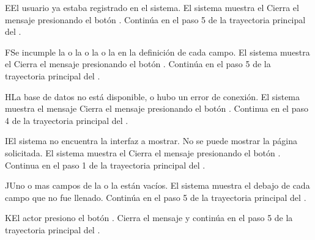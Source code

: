 \begin{UCtrayectoriaA}{E}{El usuario ya estaba registrado en el sistema.}
	\UCpaso El sistema muestra el  
	\UCpaso[\UCactor] Cierra el mensaje presionando el botón .
	\UCpaso Continúa en el paso 5 de la trayectoria principal del .
\end{UCtrayectoriaA}

\begin{UCtrayectoriaA}{F}{Se incumple la  o la   o la  o la  en la definición de cada campo.}
	\UCpaso El sistema muestra el 
	\UCpaso[\UCactor] Cierra el mensaje presionando el botón .
	\UCpaso Continúa en el paso 5 de la trayectoria principal del .
\end{UCtrayectoriaA}



\begin{UCtrayectoriaA}{H}{La base de datos no está disponible, o hubo un error de conexión.}
	\UCpaso El sistema muestra el mensaje 
	\UCpaso[\UCactor] Cierra el mensaje presionando el botón .
	\UCpaso Continua en el paso 4 de la trayectoria principal del .
\end{UCtrayectoriaA}

\begin{UCtrayectoriaA}{I}{El sistema no encuentra la interfaz a mostrar.}
	\UCpaso No se puede mostrar la página solicitada.
	\UCpaso El sistema muestra el 
	\UCpaso[\UCactor] Cierra el mensaje presionando el botón .
	\UCpaso Continua en el paso 1 de la trayectoria principal del .
\end{UCtrayectoriaA}
\begin{UCtrayectoriaA}{J}{Uno o mas campos de la  o la  están vacíos.}
	\UCpaso El sistema muestra el  debajo de cada campo que no fue llenado. 
	\UCpaso	Continúa en el paso 5 de la trayectoria principal del .
\end{UCtrayectoriaA}
\begin{UCtrayectoriaA}{K}{El actor presiono el botón .}
	\UCpaso Cierra el mensaje y continúa en el paso 5 de la trayectoria principal del .	
\end{UCtrayectoriaA}
